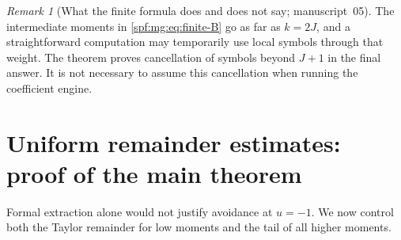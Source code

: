\documentclass[11pt]{article}
\numberwithin{equation}{section}
\theoremstyle{definition}
\theoremstyle{remark}
\newtheorem{remark}[theorem]{Remark}
\theoremstyle{definition}
\begin{document}
\begin{remark}[What the finite formula does and does not say; manuscript~05]
The intermediate moments in \eqref{spf:mg:eq:finite-B} go as far as $k=2J$,
and a straightforward computation may temporarily use local symbols
through that weight. The theorem proves cancellation of symbols beyond
$J+1$ in the final answer. It is not necessary to assume this cancellation
when running the coefficient engine.
\end{remark}

\section{Uniform remainder estimates: proof of the main theorem}
\label{spf:mg:sec:remainder}

Formal extraction alone would not justify avoidance at $u=-1$.
We now control both the Taylor remainder for low moments and the tail of
all higher moments.
\end{document}
